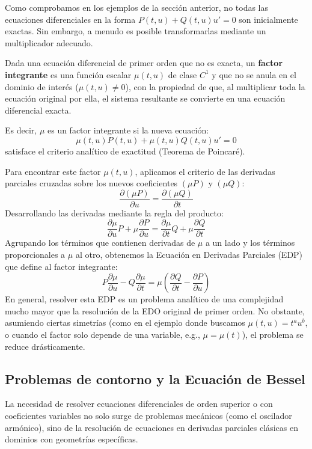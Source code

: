 Como comprobamos en los ejemplos de la sección anterior, no todas las ecuaciones diferenciales en la forma $P(t,u) + Q(t,u) u' = 0$ son inicialmente exactas. Sin embargo, a menudo es posible transformarlas mediante un multiplicador adecuado.

\begin{definición}
    Dada una ecuación diferencial de primer orden que no es exacta, un \textbf{factor integrante} es una función escalar $\mu(t,u)$ de clase $C^1$ y que no se anula en el dominio de interés ($\mu(t,u) \neq 0$), con la propiedad de que, al multiplicar toda la ecuación original por ella, el sistema resultante se convierte en una ecuación diferencial exacta. 
    
    Es decir, $\mu$ es un factor integrante si la nueva ecuación:
    \[
        \mu(t,u) P(t,u) + \mu(t,u) Q(t,u) u' = 0
    \]
    satisface el criterio analítico de exactitud (Teorema de Poincaré).
\end{definición}

Para encontrar este factor $\mu(t,u)$, aplicamos el criterio de las derivadas parciales cruzadas sobre los nuevos coeficientes $(\mu P)$ y $(\mu Q)$:
\[
    \frac{\partial (\mu P)}{\partial u} = \frac{\partial (\mu Q)}{\partial t}
\]
Desarrollando las derivadas mediante la regla del producto:
\[
    \frac{\partial \mu}{\partial u} P + \mu \frac{\partial P}{\partial u} = \frac{\partial \mu}{\partial t} Q + \mu \frac{\partial Q}{\partial t}
\]
Agrupando los términos que contienen derivadas de $\mu$ a un lado y los términos proporcionales a $\mu$ al otro, obtenemos la Ecuación en Derivadas Parciales (EDP) que define al factor integrante:
\[
    P \frac{\partial \mu}{\partial u} - Q \frac{\partial \mu}{\partial t} = \mu \left( \frac{\partial Q}{\partial t} - \frac{\partial P}{\partial u} \right)
\]
En general, resolver esta EDP es un problema analítico de una complejidad mucho mayor que la resolución de la EDO original de primer orden. No obstante, asumiendo ciertas simetrías (como en el ejemplo donde buscamos $\mu(t,u) = t^a u^b$, o cuando el factor solo depende de una variable, e.g., $\mu = \mu(t)$), el problema se reduce drásticamente.

\subsection{Problemas de contorno y la Ecuación de Bessel}

La necesidad de resolver ecuaciones diferenciales de orden superior o con coeficientes variables no solo surge de problemas mecánicos (como el oscilador armónico), sino de la resolución de ecuaciones en derivadas parciales clásicas en dominios con geometrías específicas. 

